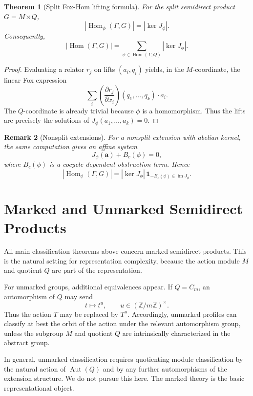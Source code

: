\documentclass[11pt]{article}
\newtheorem{theorem}{Theorem}[section]
\newtheorem{remark}[theorem]{Remark}
\begin{document}
\begin{theorem}[Split Fox-Hom lifting formula]
For the split semidirect product $G=M\rtimes Q$,
\[
|\operatorname{Hom}_\phi(\Gamma,G)|
=
|\ker J_\phi|.
\]
Consequently,
\[
|\operatorname{Hom}(\Gamma,G)|
=
\sum_{\phi\in\operatorname{Hom}(\Gamma,Q)}
|\ker J_\phi|.
\]
\end{theorem}

\begin{proof}
Evaluating a relator $r_j$ on lifts $(a_i,q_i)$ yields, in the $M$-coordinate, the linear Fox expression
\[
\sum_i
\left(\frac{\partial r_j}{\partial x_i}\right)(q_1,\ldots,q_k)\cdot a_i.
\]
The $Q$-coordinate is already trivial because $\phi$ is a homomorphism. Thus the lifts are precisely the solutions of $J_\phi(a_1,\ldots,a_k)=0$.
\end{proof}

\begin{remark}[Nonsplit extensions]
For a nonsplit extension with abelian kernel, the same computation gives an affine system
\[
J_\phi(\mathbf a)+B_c(\phi)=0,
\]
where $B_c(\phi)$ is a cocycle-dependent obstruction term. Hence
\[
|\operatorname{Hom}_\phi(\Gamma,G)|
=
|\ker J_\phi|\,
\mathbf 1_{-B_c(\phi)\in\operatorname{im}J_\phi}.
\]
\end{remark}

\section{Marked and Unmarked Semidirect Products}

All main classification theorems above concern marked semidirect products. This is the natural setting for representation complexity, because the action module $M$ and quotient $Q$ are part of the representation.

For unmarked groups, additional equivalences appear. If $Q=C_m$, an automorphism of $Q$ may send
\[
t\mapsto t^u,
\qquad
u\in(\mathbb Z/m\mathbb Z)^\times.
\]
Thus the action $T$ may be replaced by $T^u$. Accordingly, unmarked profiles can classify at best the orbit of the action under the relevant automorphism group, unless the subgroup $M$ and quotient $Q$ are intrinsically characterized in the abstract group.

In general, unmarked classification requires quotienting module classification by the natural action of $\operatorname{Aut}(Q)$ and by any further automorphisms of the extension structure. We do not pursue this here. The marked theory is the basic representational object.
\end{document}
